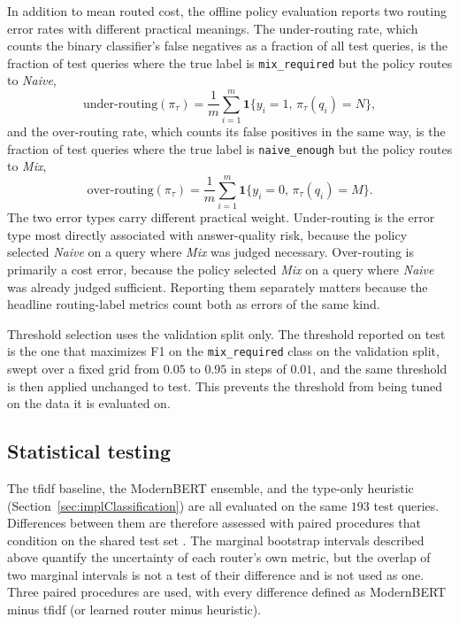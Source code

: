 \documentclass[english, bibtex]{kththesis}               %
\numberwithin{listing}{chapter}
\begin{document}
In addition to mean routed cost, the offline policy evaluation reports two routing error rates with different practical meanings. The under-routing rate, which counts the binary classifier's false negatives as a fraction of all test queries, is the fraction of test queries where the true label is \texttt{mix\_required} but the policy routes to \emph{Naive},
\begin{equation}
\label{eq:underRouting}
\mathrm{under\text{-}routing}(\pi_\tau)
=
\frac{1}{m}
\sum_{i=1}^{m}
\mathbf{1}\{y_i = 1,\, \pi_\tau(q_i) = N\},
\end{equation}
and the over-routing rate, which counts its false positives in the same way, is the fraction of test queries where the true label is \texttt{naive\_enough} but the policy routes to \emph{Mix},
\begin{equation}
\label{eq:overRouting}
\mathrm{over\text{-}routing}(\pi_\tau)
=
\frac{1}{m}
\sum_{i=1}^{m}
\mathbf{1}\{y_i = 0,\, \pi_\tau(q_i) = M\}.
\end{equation}
The two error types carry different practical weight. Under-routing is the error type most directly associated with answer-quality risk, because the policy selected \emph{Naive} on a query where \emph{Mix} was judged necessary. Over-routing is primarily a cost error, because the policy selected \emph{Mix} on a query where \emph{Naive} was already judged sufficient. Reporting them separately matters because the headline routing-label metrics count both as errors of the same kind.

Threshold selection uses the validation split only. The threshold reported on test is the one that maximizes F1 on the \texttt{mix\_required} class on the validation split, swept over a fixed grid from $0.05$ to $0.95$ in steps of $0.01$, and the same threshold is then applied unchanged to test. This prevents the threshold from being tuned on the data it is evaluated on.

\subsection{Statistical testing}
\label{sec:methodStats}

The \gls{tfidf} baseline, the ModernBERT ensemble, and the type-only heuristic (Section~\ref{sec:implClassification}) are all evaluated on the same $193$ test queries. Differences between them are therefore assessed with paired procedures that condition on the shared test set \cite{dietterich1998}. The marginal bootstrap intervals described above quantify the uncertainty of each router's own metric, but the overlap of two marginal intervals is not a test of their difference and is not used as one. Three paired procedures are used, with every difference defined as ModernBERT minus \gls{tfidf} (or learned router minus heuristic).
\end{document}
